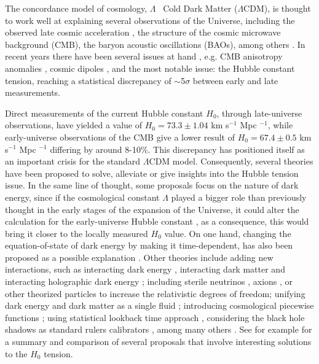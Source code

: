 \documentclass[onecolumn,superscriptaddress,secnumarabic,amssymb,amsmath,nobibnotes,aps,prd,nofootinbib,altaffilletter]{revtex4}
\begin{document}
The concordance model of cosmology, $\Lambda$~ Cold Dark Matter ($\Lambda$CDM), is thought to work well at explaining several observations of the Universe, including the observed late cosmic acceleration \cite{riess1998observational, 1999Perlmutter}, the structure of the cosmic microwave background (CMB), the baryon acoustic oscillations (BAOs), among others \cite{dodelson_schmidt_2021}. In recent years there have been several issues at hand \cite{Perivolaropoulos_2022}, e.g. CMB anisotropy anomalies \cite{Schwarz_2016}, cosmic dipoles \cite{Perivolaropoulos_2022}, and the most notable issue: the Hubble constant tension, reaching a statistical discrepancy of $\sim$5$\sigma$ \cite{Planck_2020, kamionkowski2022hubble, Riess_2022, DiValentino:2020zio} between early and late measurements.

Direct measurements of the current Hubble constant $H_0$, through late-universe observations, have yielded a value of $H_0 = 73.3 \pm 1.04$ km s$^{-1}$ Mpc $^{-1}$\cite{Riess_2022}, while early-universe observations of the CMB give a lower result of $H_0 = 67.4 \pm 0.5$ km s$^{-1}$ Mpc $^{-1}$ \cite{Planck_2020} differing by around 8-10\%. This discrepancy has positioned itself as an important crisis for the standard $\Lambda$CDM model. Consequently, several theories have been proposed to solve, alleviate or give insights into the Hubble tension issue. In the same line of thought, some proposals focus on the nature of dark energy, since if the cosmological constant $\Lambda$ played a bigger role than previously thought in the early stages of the expansion of the Universe, it could alter the calculation for the early-universe Hubble constant \cite{Karwal_2016}, as a consequence, this would bring it closer to the locally measured $H_0$ value. On one hand, changing the equation-of-state of dark energy by making it time-dependent, has also been proposed as a possible explanation \cite{Zhao_2017}. Other theories include adding new interactions, such as interacting dark energy \cite{Aich:2022idb,Kim:2023oxg},  interacting dark matter \cite{Cao_2011} and interacting holographic dark energy \cite{Escamilla-Rivera:2022baz}; including sterile neutrinos \cite{Salvio:2021puw}, axions \cite{Berlin:2016bdv}, or other theorized particles to increase the relativistic degrees of freedom; unifying dark energy and dark matter as a single fluid \cite{Farnes:2017gbf}; introducing cosmological piecewise functions \cite{Sandoval-Orozco:2022not}; using statistical lookback time approach \cite{Escamilla-Rivera:2023msg}, considering the black hole shadows as standard rulers calibrators \cite{Escamilla-Rivera:2022mkc}, among many others \cite{Di_Valentino_2021, Adhikari:2022sve,Abdalla:2022yfr}. See for example \cite{Schoneberg:2021qvd} for a summary and comparison of several proposals that involve interesting solutions to the $H_0$ tension.
\end{document}
